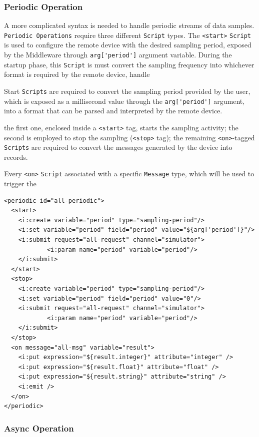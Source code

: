 \subsubsection{Periodic Operation}

A more complicated syntax is needed to handle periodic streams of data samples.
\texttt{Periodic Operations} require three different \texttt{Script} types.
The \lstinline!<start>! \texttt{Script} is used to configure the remote device
with the desired sampling period, exposed by the Middleware through
\lstinline!arg['period']! argument variable. During the startup phase, this
\texttt{Script} is must convert the sampling frequency into whichever format is
required by the remote device, handle 

Start \texttt{Scripts} are
required to convert the sampling period provided by the user, which is exposed
as a millisecond value through the \lstinline!arg['period']! argument, into a
format that can be parsed and interpreted by the remote device.

the first one, enclosed inside a \lstinline!<start>!  tag,
starts the sampling activity; the second is employed to stop the sampling
(\lstinline!<stop>! tag); the remaining \lstinline!<on>!-tagged
\texttt{Scripts} are required to convert the messages generated by the device
into records. 

Every \lstinline!<on>! \texttt{Script} associated with a specific
\texttt{Message} type, which will be used to trigger the 

\lstset{language=XML}
\begin{lstlisting}
<periodic id="all-periodic">
  <start>
    <i:create variable="period" type="sampling-period"/>
    <i:set variable="period" field="period" value="${arg['period']}"/>
    <i:submit request="all-request" channel="simulator">
            <i:param name="period" variable="period"/>
    </i:submit>
  </start>
  <stop>
    <i:create variable="period" type="sampling-period"/>
    <i:set variable="period" field="period" value="0"/>
    <i:submit request="all-request" channel="simulator">
            <i:param name="period" variable="period"/>
    </i:submit>
  </stop>
  <on message="all-msg" variable="result">
    <i:put expression="${result.integer}" attribute="integer" />
    <i:put expression="${result.float}" attribute="float" />
    <i:put expression="${result.string}" attribute="string" />
    <i:emit />
  </on>
</periodic>
\end{lstlisting}

\subsubsection{Async Operation}


